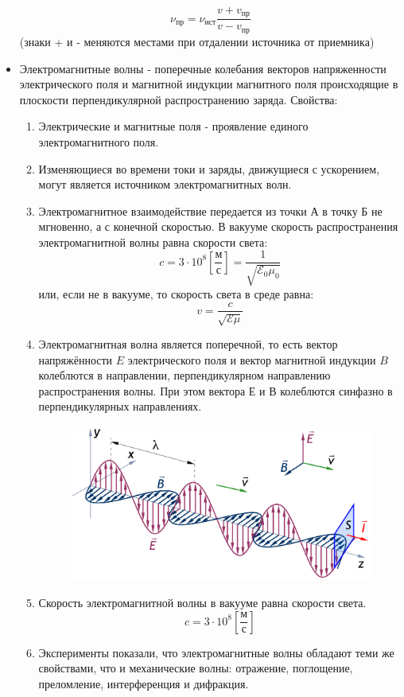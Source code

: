 \documentclass{article}
\begin{document}
\begin{flushleft}
\begin{itemize}
        \[
        \nu_\text{пр} = \nu_\text{ист}\frac{v + v_\text{пр}}{v - v_\text{пр}}
        \]
        (знаки + и - меняются местами при отдалении источника от приемника)
        \item Электромагнитные волны - поперечные колебания векторов напряженности электрического поля и магнитной индукции магнитного поля происходящие в плоскости перпендикулярной распространению заряда.
        Свойства: 
        \begin{enumerate}
            \item Электрические и магнитные поля - проявление единого электромагнитного поля.
            \item Изменяющиеся во времени токи и заряды, движущиеся с ускорением, могут является источником электромагнитных волн.
            \item Электромагнитное взаимодействие передается из точки А в точку Б не мгновенно, а с конечной скоростью. В вакууме скорость распространения электромагнитной волны равна скорости света: \[
            c = 3 \cdot 10^8 [\frac{\text{м}}{\text{с}}] = \frac{1}{\sqrt{\mathcal{E}_0 \mu_0}}
            \]
            или, если не в вакууме, то скорость света в среде равна: \[
            v = \frac{c}{\sqrt{\mathcal{E}\mu}}
            \]
            \item Электромагнитная волна является поперечной, то есть вектор напряжённости $E$ электрического поля и вектор магнитной индукции $B$ колеблются в направлении, перпендикулярном направлению распространения волны. При этом вектора $Е$ и $В$ колеблются синфазно в перпендикулярных направлениях.
            \begin{figure}[H]
                \centering
                \includegraphics[width=0.5\linewidth]{images/348740.png}
                \label{fig:enter-label}
            \end{figure}
            \item Скорость электромагнитной волны в вакууме равна скорости света.\[
            c = 3 \cdot 10^8 [\frac{\text{м}}{\text{с}}]
            \]
            \item Эксперименты показали, что электромагнитные волны обладают теми же свойствами, что и механические волны: отражение, поглощение, преломление, интерференция и дифракция.

\end{enumerate}
\end{itemize}
\end{flushleft}
\end{document}
